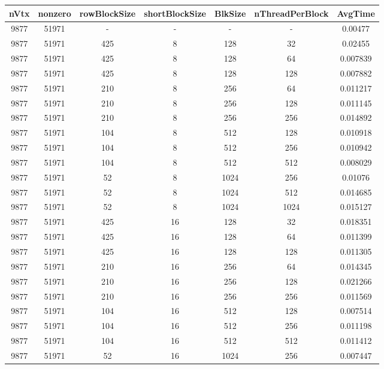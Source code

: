 \documentclass[9pt]{article}
\begin{document}
\SetBgPosition{0.25cm,-5.0cm}
\begin{tabular}{|c|c|c|c|c|c|c| }  
\hline
nVtx  & nonzero  & rowBlockSize  & shortBlockSize  & BlkSize  & nThreadPerBlock  & AvgTime \\
\hline
9877  & 51971  &  -  & -  & -  & -  &0.00477 \\
\hline
9877  & 51971  & 425  & 8  & 128  & 32  & 0.02455 \\
\hline
9877  & 51971  & 425  & 8  & 128  & 64  & 0.007839 \\
\hline
9877  & 51971  & 425  & 8  & 128  & 128  & 0.007882 \\
\hline
9877  & 51971  & 210  & 8  & 256  & 64  & 0.011217 \\
\hline
9877  & 51971  & 210  & 8  & 256  & 128  & 0.011145 \\
\hline
9877  & 51971  & 210  & 8  & 256  & 256  & 0.014892 \\
\hline
9877  & 51971  & 104  & 8  & 512  & 128  & 0.010918 \\
\hline
9877  & 51971  & 104  & 8  & 512  & 256  & 0.010942 \\
\hline
9877  & 51971  & 104  & 8  & 512  & 512  & 0.008029 \\
\hline
9877  & 51971  & 52  & 8  & 1024  & 256  & 0.01076 \\
\hline
9877  & 51971  & 52  & 8  & 1024  & 512  & 0.014685 \\
\hline
9877  & 51971  & 52  & 8  & 1024  & 1024  & 0.015127 \\
\hline
9877  & 51971  & 425  & 16  & 128  & 32  & 0.018351 \\
\hline
9877  & 51971  & 425  & 16  & 128  & 64  & 0.011399 \\
\hline
9877  & 51971  & 425  & 16  & 128  & 128  & 0.011305 \\
\hline
9877  & 51971  & 210  & 16  & 256  & 64  & 0.014345 \\
\hline
9877  & 51971  & 210  & 16  & 256  & 128  & 0.021266 \\
\hline
9877  & 51971  & 210  & 16  & 256  & 256  & 0.011569 \\
\hline
9877  & 51971  & 104  & 16  & 512  & 128  & 0.007514 \\
\hline
9877  & 51971  & 104  & 16  & 512  & 256  & 0.011198 \\
\hline
9877  & 51971  & 104  & 16  & 512  & 512  & 0.011412 \\
\hline
9877  & 51971  & 52  & 16  & 1024  & 256  & 0.007447 \\

\end{tabular}
\end{document}
